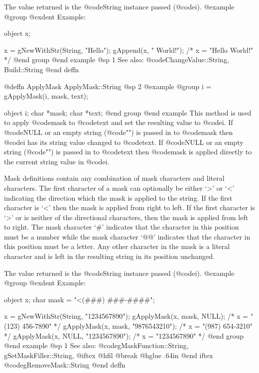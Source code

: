 The value returned is the @code{String} instance passed (@code{i}).
@example
@group
@exdent Example:

object  x;

x = gNewWithStr(String, "Hello");
gAppend(x, " World!");
/*  x = "Hello World!"  */
@end group
@end example
@sp 1
See also:  @code{ChangeValue::String, Build::String}
@end deffn












@deffn {ApplyMask} ApplyMask::String
@sp 2
@example
@group
i = gApplyMask(i, mask, text);

object  i;
char    *mask;
char    *text;
@end group
@end example
This method is used to apply @code{mask} to @code{text} and set the
resulting value to @code{i}.  If @code{NULL} or an empty string
(@code{""}) is passed in to @code{mask} then @code{i} has its string
value changed to @code{text}.  If @code{NULL} or an empty string
(@code{""}) is passed in to @code{text} then @code{mask} is applied
directly to the current string value in @code{i}.

Mask definitions contain any combination of mask characters and literal
characters.  The first character of a mask can optionally be either `>'
or `<' indicating the direction which the mask is applied to the string.
If the first character is `<' then the mask is applied from right to
left.  If the first character is `>' or is neither of the directional
characters, then the mask is applied from left to right.  The mask
character `#' indicates that the character in this position must be a
number while the mask character `@@' indicates that the character in
this position must be a letter.  Any other character in the mask is a
literal character and is left in the resulting string in its position
unchanged.

The value returned is the @code{String} instance passed (@code{i}).
@example
@group
@exdent Example:

object  x;
char    mask = "<(###) ###-####";

x = gNewWithStr(String, "1234567890");
gApplyMask(x, mask, NULL);         /* x = "(123) 456-7890" */
gApplyMask(x, mask, "9876543210"); /* x = "(987) 654-3210" */
gApplyMask(x, NULL, "1234567890"); /* x = "1234567890"     */
@end group
@end example
@sp 1
See also:  @code{gMaskFunction::String, gSetMaskFiller::String,}
@iftex
@hfil @break @hglue .64in      
@end iftex
@code{gRemoveMask::String}
@end deffn















